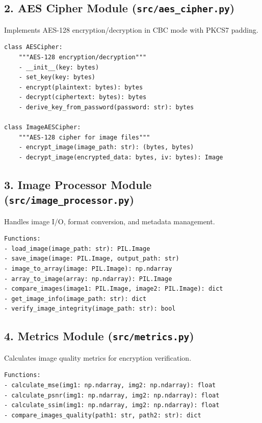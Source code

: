 \documentclass[12pt,a4paper]{report}
\begin{document}
\subsection{2. AES Cipher Module (\texttt{src/aes\_cipher.py})}

Implements AES-128 encryption/decryption in CBC mode with PKCS7 padding.

\begin{lstlisting}[caption=AES Cipher Classes]
class AESCipher:
    """AES-128 encryption/decryption"""
    - __init__(key: bytes)
    - set_key(key: bytes)
    - encrypt(plaintext: bytes): bytes
    - decrypt(ciphertext: bytes): bytes
    - derive_key_from_password(password: str): bytes

class ImageAESCipher:
    """AES-128 cipher for image files"""
    - encrypt_image(image_path: str): (bytes, bytes)
    - decrypt_image(encrypted_data: bytes, iv: bytes): Image
\end{lstlisting}

\subsection{3. Image Processor Module (\texttt{src/image\_processor.py})}

Handles image I/O, format conversion, and metadata management.

\begin{lstlisting}[caption=Image Processor Functions]
Functions:
- load_image(image_path: str): PIL.Image
- save_image(image: PIL.Image, output_path: str)
- image_to_array(image: PIL.Image): np.ndarray
- array_to_image(array: np.ndarray): PIL.Image
- compare_images(image1: PIL.Image, image2: PIL.Image): dict
- get_image_info(image_path: str): dict
- verify_image_integrity(image_path: str): bool
\end{lstlisting}

\subsection{4. Metrics Module (\texttt{src/metrics.py})}

Calculates image quality metrics for encryption verification.

\begin{lstlisting}[caption=Quality Metrics]
Functions:
- calculate_mse(img1: np.ndarray, img2: np.ndarray): float
- calculate_psnr(img1: np.ndarray, img2: np.ndarray): float
- calculate_ssim(img1: np.ndarray, img2: np.ndarray): float
- compare_images_quality(path1: str, path2: str): dict
\end{lstlisting}
\end{document}

